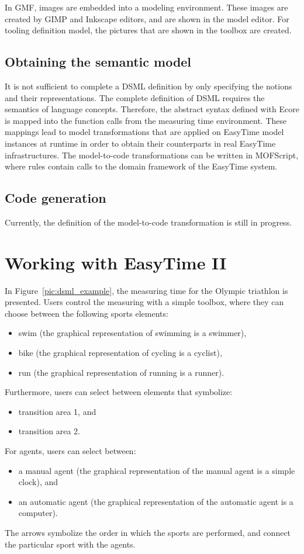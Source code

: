 \documentclass[preprint, prX]{revtex4}
\begin{document}
In GMF, images are embedded into a modeling environment. These images are created by GIMP and Inkscape editors, and are shown in the model editor. For tooling definition model, the pictures that are shown in the toolbox are created. 

\subsection{Obtaining the semantic model}

It is not sufficient to complete a DSML definition by only specifying the notions and their representations. The complete definition of DSML requires the semantics of language concepts. Therefore, the abstract syntax defined with Ecore is mapped  into the function calls from the measuring time environment. These mappings lead to model transformations that are applied on EasyTime model instances at runtime in order to obtain their counterparts in real EasyTime infrastructures. The model-to-code transformations can be written in MOFScript, where rules contain calls to the domain framework of the EasyTime system. 

\subsection{Code generation}
Currently, the definition of the model-to-code transformation is still in progress.

\section{Working with EasyTime II}

In Figure~\ref{pic:dsml_example}, the measuring time for the Olympic triathlon is presented. Users control the measuring with a simple toolbox, where they can choose between the following sports elements:
\begin{itemize}
\item swim (the graphical representation of swimming is a swimmer),
\item bike (the graphical representation of cycling is a cyclist), 
\item run (the graphical representation of running is a runner).
\end{itemize}
Furthermore, users can select between elements that symbolize:
\begin{itemize}
\item transition area 1, and
\item transition area 2.
\end{itemize}
For agents, users can select between:
\begin{itemize}
\item a manual agent (the graphical representation of the manual agent is a simple clock), and
\item an automatic agent (the graphical representation of the automatic agent is a computer).
\end{itemize}
The arrows symbolize the order in which the sports are performed, and connect the particular sport with the agents.
\end{document}

